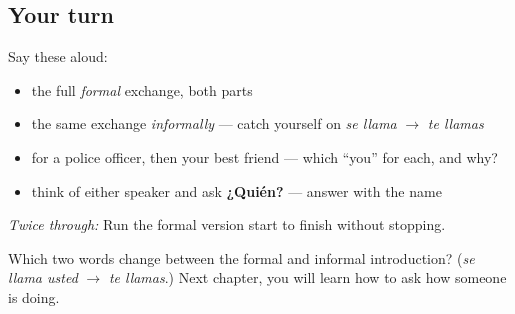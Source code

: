 \subsection*{Your turn}
Say these aloud:

\begin{itemize}
\raggedright
  \item the full \emph{formal} exchange, both parts
  \item the same exchange \emph{informally} — catch yourself on \emph{se llama} $\to$ \emph{te llamas}
  \item for a police officer, then your best friend — which \textquotedblleft{}you\textquotedblright{} for each, and why?
  \item think of either speaker and ask \textbf{¿Quién?} — answer with the name
\end{itemize}

\emph{Twice through:} Run the formal version start to finish without stopping.

\begin{tcolorbox}[breakable,colback=teal!4,colframe=teal!35!black,title={Before you move on}]
Which two words change between the formal and informal introduction? (\emph{se llama usted} $\to$ \emph{te llamas}.) Next chapter, you will learn how to ask how someone is doing.
\end{tcolorbox}
